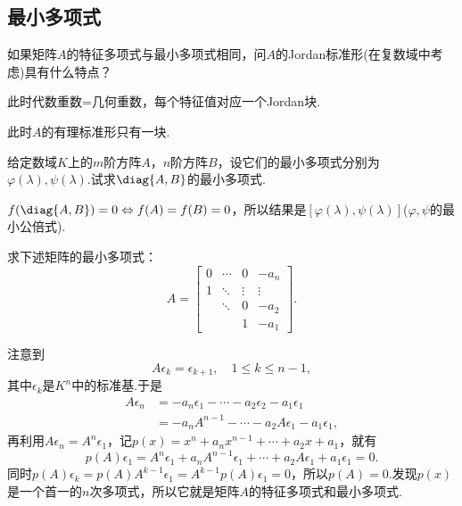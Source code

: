 \subsection{最小多项式}
\begin{prob}[1]
	如果矩阵$A$的特征多项式与最小多项式相同，问$A$的Jordan标准形(在复数域中考虑)具有什么特点？
\end{prob}
\begin{sol}
	此时代数重数=几何重数，每个特征值对应一个Jordan块.
\end{sol}
\begin{note}
	此时$A$的有理标准形只有一块.
\end{note}
\begin{prob}[6]
	给定数域$K$上的$m$阶方阵$A$，$n$阶方阵$B$，设它们的最小多项式分别为$\varphi(\lambda),\psi(\lambda)$.试求$\diag{A,B}$的最小多项式.
\end{prob}
\begin{sol}
	$f(\diag{A,B})=0\Leftrightarrow f(A)=f(B)=0$，所以结果是$[\varphi(\lambda),\psi(\lambda)]$($\varphi,\psi$的最小公倍式).
\end{sol}
\begin{prob}[7]
	求下述矩阵\footnotemark 的最小多项式：
	\[
		A=\begin{bmatrix}
			0 & \cdots & 0      & -a_n   \\
			1 & \ddots & \vdots & \vdots \\
			  & \ddots & 0      & -a_2   \\
			  &        & 1      & -a_1
		\end{bmatrix}.
	\]
\end{prob}
\begin{sol}
	注意到
	\[
		A\epsilon_k=\epsilon_{k+1},\quad 1\le k\le n-1,
	\]
	其中$\epsilon_k$是$K^n$中的标准基.于是
	\begin{align*}
		A\epsilon_n & =-a_n\epsilon_1-\cdots-a_2\epsilon_2-a_1\epsilon_1 \\
		            & =-a_nA^{n-1}-\cdots-a_2A\epsilon_1-a_1\epsilon_1,
	\end{align*}
	再利用$A\epsilon_n=A^n\epsilon_1$，记$p(x)=x^n+a_nx^{n-1}+\cdots+a_2x+a_1$，就有
	\[
		p(A)\epsilon_1=A^n\epsilon_1+a_nA^{n-1}\epsilon_1+\cdots+a_2A\epsilon_1+a_1\epsilon_1=0.
	\]
	同时$p(A)\epsilon_k=p(A)A^{k-1}\epsilon_1=A^{k-1}p(A)\epsilon_1=0$，所以$p(A)=0$.发现$p(x)$是一个首一的$n$次多项式，所以它就是矩阵$A$的特征多项式\footnotemark 和最小多项式.
\end{sol}
